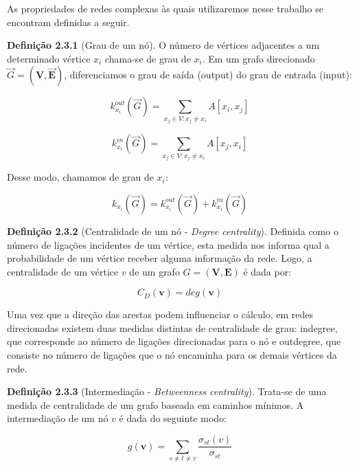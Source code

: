 As propriedades de redes complexas às quais utilizaremos nesse trabalho se encontram definidas a seguir.

\noindent \textbf{Definição 2.3.1} (Grau de um nó). O número de vértices adjacentes a um determinado vértice $x_i$ chama-se de grau de $x_i$. Em um grafo direcionado $\Vec G = (\bm V,\bm \Vec E)$, diferenciamos o grau de saída (output) do grau de entrada (input):

\begin{equation}
k^{out}_{x_{i}}(\Vec{G}) = \sum_{x_j \in V : x_j \neq x_i}^{} A[x_i,x_j]
\label{eq:grauOutput}
\end{equation}

\begin{equation}
k^{in}_{x_{i}}(\Vec{G}) = \sum_{x_j \in V : x_j \neq x_i}^{} A[x_j,x_i]
\label{eq:grauInput}
\end{equation}

Desse modo, chamamos de grau de $x_i$: 

\begin{equation}
k_{x_i}(\Vec{G}) = k^{out}_{x_{i}}(\Vec{G}) + k^{in}_{x_{i}}(\Vec{G})
\label{eq:grau}
\end{equation}

\noindent \textbf{Definição 2.3.2} (Centralidade de um nó - \textit{Degree centrality}). Definida como o número de ligações incidentes de um vértice, esta medida nos informa qual a probabilidade de um vértice receber alguma informação da rede. Logo, a centralidade de um vértice $v$ de um grafo $G = (\bm V,\bm E)$ é dada por:

\begin{equation}
    C_D(\bm v) = deg(\bm v)
\end{equation}

Uma vez que a direção das arestas podem influenciar o cálculo, em redes direcionadas existem duas medidas distintas de centralidade de grau: indegree, que corresponde ao número de ligações direcionadas para o nó e outdegree, que consiste no número de ligações que o nó encaminha para os demais vértices da rede. 

\noindent \textbf{Definição 2.3.3} (Intermediação - \textit{Betweenness centrality}). Trata-se de uma medida de centralidade de um grafo baseada em caminhos mínimos. A intermediação de um nó $v$ é dada do seguinte modo: 

\begin{equation}
    g(\bm v) = \sum_{s \neq t \neq v} \frac{\sigma_{st}(v)}{\sigma_{st}}
\end{equation}

